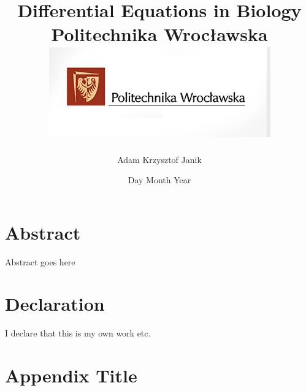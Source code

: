 \documentclass[12pt,twoside]{report}
\title{
	{Differential Equations in Biology}\\
	{\large Politechnika Wrocławska}\\
	{\includegraphics{pwr_logo.jpg}}
}
\author{Adam Krzysztof Janik}
\date{Day Month Year}
\begin{document}
\maketitle

\chapter*{Abstract}
Abstract goes here


\chapter*{Declaration}
I declare that this is my own work etc.


\tableofcontents











\appendix
\chapter{Appendix Title}

\end{document}
